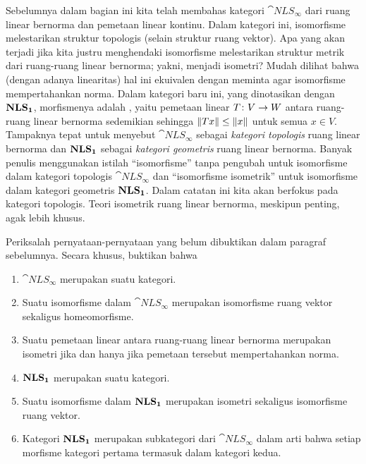 Sebelumnya dalam bagian ini kita telah membahas kategori
$\cat{NLS_{\boldsymbol\infty}}$ dari ruang linear bernorma dan pemetaan linear kontinu.
Dalam kategori ini, isomorfisme melestarikan struktur topologis (selain struktur ruang
vektor). Apa yang akan terjadi jika kita justru menghendaki isomorfisme melestarikan
struktur metrik dari ruang-ruang linear bernorma; yakni, menjadi isometri? Mudah
dilihat bahwa (dengan adanya linearitas) hal ini ekuivalen dengan meminta agar isomorfisme
mempertahankan norma. Dalam kategori baru ini, yang dinotasikan dengan
$\mathbf{NLS_{\mathbf{1}}}$, morfismenya adalah
, yaitu pemetaan linear $T\colon V \rightarrow W$ antara
ruang-ruang linear bernorma sedemikian sehingga $\lVert Tx\rVert \le \lVert x\rVert$ untuk semua
$x \in V$. Tampaknya tepat untuk menyebut $\cat{NLS_{\boldsymbol\infty}}$ sebagai
\emph{kategori topologis} ruang linear bernorma dan $\mathbf{NLS_{\mathbf{1}}}$ sebagai
\emph{kategori geometris} ruang linear bernorma. Banyak penulis menggunakan istilah
``isomorfisme'' tanpa pengubah untuk isomorfisme dalam kategori topologis
$\cat{NLS_{\boldsymbol\infty}}$ dan
``isomorfisme isometrik'' untuk isomorfisme dalam kategori geometris
$\mathbf{NLS_{\mathbf{1}}}$. Dalam catatan ini kita akan berfokus pada kategori topologis.
Teori isometrik ruang linear bernorma, meskipun penting, agak lebih khusus.

\begin{exer} Periksalah pernyataan-pernyataan yang belum dibuktikan dalam paragraf
sebelumnya. Secara khusus, buktikan bahwa
 \begin{enumerate}
    \item[(a)] $\cat{NLS_{\boldsymbol\infty}}$ merupakan suatu kategori.
    \item[(b)] Suatu isomorfisme dalam $\cat{NLS_{\boldsymbol\infty}}$ merupakan
isomorfisme ruang vektor sekaligus homeomorfisme.
    \item[(c)] Suatu pemetaan linear antara ruang-ruang linear bernorma merupakan isometri
jika dan hanya jika pemetaan tersebut mempertahankan norma.
    \item[(d)] $\mathbf{NLS_{\mathbf{1}}}$ merupakan suatu kategori.
    \item[(e)] Suatu isomorfisme dalam $\mathbf{NLS_{\mathbf{1}}}$ merupakan isometri sekaligus
isomorfisme ruang vektor.
    \item[(f)] Kategori $\mathbf{NLS_{\mathbf{1}}}$ merupakan subkategori dari
$\cat{NLS_{\boldsymbol\infty}}$ dalam arti bahwa setiap morfisme kategori pertama
termasuk dalam kategori kedua.
 \end{enumerate}
\end{exer}













